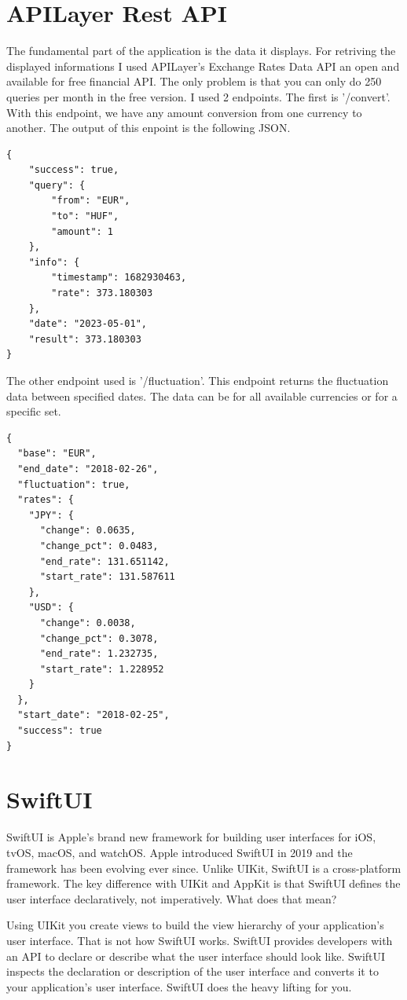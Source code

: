 \documentclass{report}
\begin{document}
\section{APILayer Rest API}

The fundamental part of the application is the data it displays. For retriving the displayed informations I used APILayer's Exchange Rates Data API an open and available for free financial API.  The only problem is that you can only do 250 queries per month in the free version. I used 2 endpoints. The first is '/convert'. With this endpoint, we have any amount conversion from one currency to another. The output of this enpoint is the following JSON.

\begin{lstlisting}
{
    "success": true,
    "query": {
        "from": "EUR",
        "to": "HUF",
        "amount": 1
    },
    "info": {
        "timestamp": 1682930463,
        "rate": 373.180303
    },
    "date": "2023-05-01",
    "result": 373.180303
}
\end{lstlisting}

The other endpoint used is '/fluctuation'. This endpoint returns the fluctuation data between specified dates. The data can be for all available currencies or for a specific set.
\begin{lstlisting}
{
  "base": "EUR",
  "end_date": "2018-02-26",
  "fluctuation": true,
  "rates": {
    "JPY": {
      "change": 0.0635,
      "change_pct": 0.0483,
      "end_rate": 131.651142,
      "start_rate": 131.587611
    },
    "USD": {
      "change": 0.0038,
      "change_pct": 0.3078,
      "end_rate": 1.232735,
      "start_rate": 1.228952
    }
  },
  "start_date": "2018-02-25",
  "success": true
}
\end{lstlisting}

\section{SwiftUI}

SwiftUI is Apple's brand new framework for building user interfaces for iOS, tvOS, macOS, and watchOS. Apple introduced SwiftUI in 2019 and the framework has been evolving ever since. Unlike UIKit, SwiftUI is a cross-platform framework. The key difference with UIKit and AppKit is that SwiftUI defines the user interface declaratively, not imperatively. What does that mean?

Using UIKit you create views to build the view hierarchy of your application's user interface. That is not how SwiftUI works. SwiftUI provides developers with an API to declare or describe what the user interface should look like. SwiftUI inspects the declaration or description of the user interface and converts it to your application's user interface. SwiftUI does the heavy lifting for you.
\end{document}
